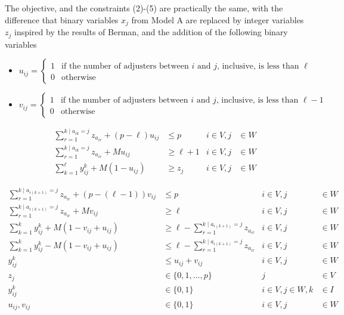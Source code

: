 \begin{frame}[allowframebreaks]
  The objective, and the constraints (2)-(5) are practically the same,
  with the difference that binary variables $x_j$ from Model A
  are replaced by integer variables $z_j$ inspired by the results of Berman,
  and the addition of the following binary variables
  {\scriptsize
    \begin{itemize}
    \item $u_{ij} = \begin{cases} 1 & \mbox{if the number of adjusters between } i \mbox{ and } j \mbox{, inclusive, is less than } \ell \\
      0 & \mbox{otherwise}
    \end{cases}$
    \item $v_{ij} = \begin{cases} 1 & \mbox{if the number of adjusters between } i \mbox{ and } j \mbox{, inclusive, is less than } \ell - 1 \\
      0 & \mbox{otherwise}
    \end{cases}$
    \end{itemize}
  }

{\footnotesize
  \begin{align}
    \sum_{r = 1}^{k \mid a_{ik}=j}{z_{a_{ir}}} + (p-\ell) u_{ij} & \leq p &  i \in V, j &\in W \\
    \sum_{r = 1}^{k \mid a_{ik}=j}{z_{a_{ir}}} + M u_{ij} & \geq \ell+1   &  i \in V, j &\in W \\
    \sum_{k = 1}^{\ell}{y_{ij}^{k}} + M (1 - u_{ij}) & \geq z_j           &  i \in V, j &\in W
  \end{align}
  
  \begin{align}
    \sum_{r = 1}^{k \mid a_{i(k+1)}=j}{z_{a_{ir}}} + (p-(\ell-1)) v_{ij} & \leq p                                     &  i \in V, j &\in W\\
    \sum_{r = 1}^{k \mid a_{i(k+1)}=j}{z_{a_{ir}}} + M v_{ij}         & \geq \ell                                     &  i \in V, j &\in W\\
    \sum_{k=1}^{k}{y_{ij}^{k}} + M (1 - v_{ij} + u_{ij}) & \geq \ell - \sum_{r = 1}^{k \mid a_{i(k+1)}=j}{z_{a_{ir}}} &  i \in V, j &\in W\\
    \sum_{k=1}^{k}{y_{ij}^{k}} - M (1 - v_{ij} + u_{ij}) & \leq \ell - \sum_{r = 1}^{k \mid a_{i(k+1)}=j}{z_{a_{ir}}} &  i \in V, j &\in W\\
    y_{ij}^{k} & \leq u_{ij} + v_{ij}  &        i \in V,j &\in W \\
    z_j & \in \{0,1,\ldots,p\}         &                j &\in V \nonumber\\
    y_{ij}^{k} & \in \{0,1\}           &  i\in V,j\in W,k &\in I \nonumber\\
    u_{ij},v_{ij} & \in \{0,1\}        &        i \in V,j &\in W \nonumber
  \end{align}
}
\end{frame}
